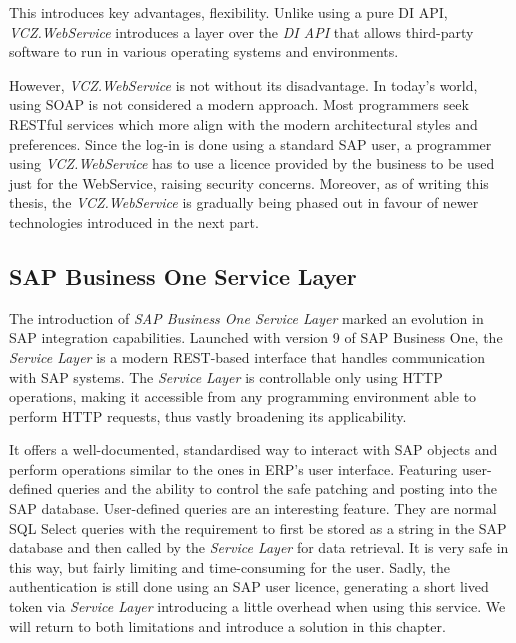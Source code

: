 This introduces key advantages, flexibility. 
Unlike using a pure DI API, \textit{VCZ.WebService} introduces a layer over the \textit{DI API} that allows third-party software to run in various operating systems and environments.

However, \textit{VCZ.WebService} is not without its disadvantage.
In today's world, using SOAP is not considered a modern approach. Most programmers seek RESTful services which more align with the modern architectural styles and preferences.
Since the log-in is done using a standard SAP user, a programmer using \textit{VCZ.WebService} has to use a licence provided by the business to be used just for the WebService, raising security concerns.
Moreover, as of writing this thesis, the \textit{VCZ.WebService} is gradually being phased out in favour of newer technologies introduced in the next part.

\subsection{SAP Business One Service Layer}
\label{subsec:sap-b1-service-layer}

The introduction of \textit{ SAP Business One Service Layer} marked an evolution in SAP integration capabilities. 
Launched with version 9 of SAP Business One, the \textit{Service Layer} is a modern REST-based interface that handles communication with SAP systems. 
The \textit{Service Layer} is controllable only using HTTP operations, making it accessible from any programming environment able to perform HTTP requests, thus vastly broadening its applicability.

It offers a well-documented, standardised way to interact with SAP objects and perform operations similar to the ones in ERP's user interface. 
Featuring user-defined queries and the ability to control the safe patching and posting into the SAP database.
User-defined queries are an interesting feature. They are normal SQL Select queries with the requirement to first be stored as a string in the SAP database and then called by the \textit{ Service Layer} for data retrieval.
It is very safe in this way, but fairly limiting and time-consuming for the user. 
Sadly, the authentication is still done using an SAP user licence, generating a short lived token via \textit{Service Layer} introducing a little overhead when using this service.
We will return to both limitations and introduce a solution in this chapter.

